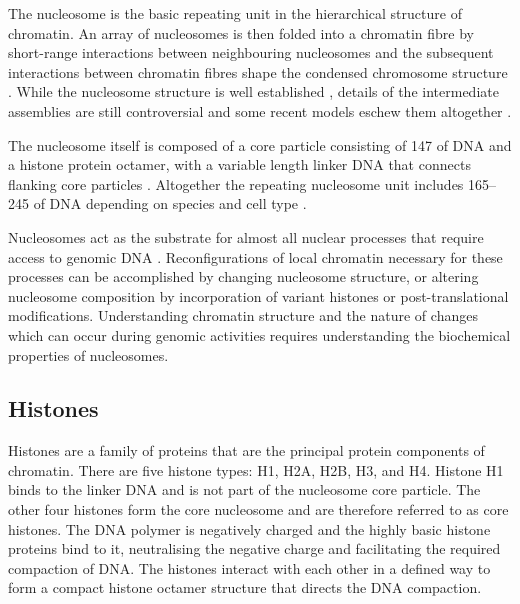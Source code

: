   The nucleosome is the
  basic repeating unit in the hierarchical structure of chromatin.
  An array of nucleosomes is then folded into a chromatin fibre by
  short-range interactions between neighbouring nucleosomes
  and the subsequent interactions between chromatin fibres shape the
  condensed chromosome structure .
  While the nucleosome
  structure is well established \citep{Luger1997structure},
  details of the
  intermediate assemblies are still controversial and some recent models
  eschew them altogether
  \citep{fussner2011-no-30nm-fibre, luger2012-chromatin-review}.

  The nucleosome itself is composed of a core particle
  consisting of \SI{147}{\bp} of DNA and a histone protein octamer,
  with a variable length linker DNA that connects
  flanking core particles .
  Altogether the repeating nucleosome unit
  includes \SIrange{165}{245}{\bp} of DNA depending on species and
  cell type \citep{widom1992-linker-length}.

  Nucleosomes act as the substrate for almost all nuclear processes that
  require access to genomic DNA \citep{controlling-double-helix}.
  Reconfigurations of local chromatin necessary for these processes can
  be accomplished by changing nucleosome structure, or altering nucleosome
  composition by incorporation of variant histones or post-translational
  modifications.
  Understanding chromatin structure and the nature of changes which can
  occur during genomic activities
  requires understanding the biochemical properties of nucleosomes.

  \subsection{Histones}

    Histones are a family of proteins that are the principal protein components
    of chromatin.
    There are five histone types: H1, H2A, H2B, H3, and H4.
    Histone H1 binds to the linker DNA and is not part of the
    nucleosome core particle.
    The other four histones form the core
    nucleosome and are therefore referred to as core histones.
    The DNA polymer is negatively charged and the highly
    basic histone proteins bind to it, neutralising the negative charge
    and facilitating the required compaction of DNA.
    The histones interact with each other in a defined way to form
    a compact histone octamer structure that directs the
    DNA compaction.


